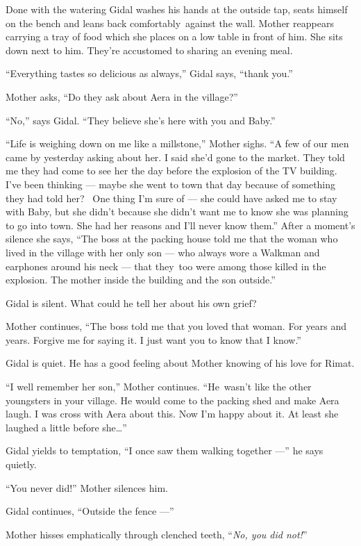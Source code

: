\documentclass[twoside,11pt]{book}
\begin{document}
Done with the watering Gidal washes his hands at the outside tap, seats himself on the bench and leans back
comfortably~against the wall. Mother reappears carrying a tray of food which she places on a low table in front of him.
She sits down next to him. They're accustomed to sharing an evening meal.

``Everything tastes so delicious as always,'' Gidal says, ``thank
you.''

Mother asks, ``Do they ask about Aera in the village?''

``No,'' says Gidal. ``They believe she's here with you and Baby.''

``Life is weighing down on me like a millstone,'' Mother sighs. ``A few of our
men came by yesterday asking about her. I said she'd gone to the market. They told me they had come to see her the day
before the explosion of the TV building. I've been thinking --- maybe she went to town that day because of something they
had told her? ~One thing I'm sure of --- she could have asked me to stay with Baby, but she didn't because she didn't
want me to know she was planning to go into town. She had her reasons and I'll never know them.'' After a moment's
silence she says, ``The boss at the packing house told me that the woman who lived in the village with her
only son --- who always wore a Walkman and earphones around his neck --- that they~too were among those killed in
the explosion. The mother inside the building and the son outside.''

Gidal is silent. What could he tell her about his own grief?

Mother continues, ``The boss told me that you loved that woman. For years and years. Forgive me for saying
it. I just want you to know that I know.''

Gidal is quiet. He has a good feeling about Mother knowing of his love for Rimat.

``I well remember her son,'' Mother continues. ``He~wasn't like the other
youngsters in your village. He would come to the packing shed and make Aera laugh. I was cross with Aera about this.
Now I'm happy about it. At least she laughed a little before she{\ldots}''

Gidal yields to temptation, ``I once saw them walking together ---'' he says quietly.

``You never did!'' Mother silences him.

Gidal continues, ``Outside the fence ---''

Mother hisses emphatically through clenched teeth, ``\textit{No, you did not!}''
\end{document}
